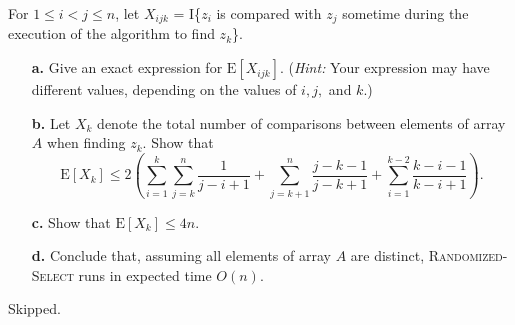 \begin{enumerate}
{For $1 \le i < j \le n$, let $X_{ijk}$ = I\{$z_i$ is compared with $z_j$
sometime during the execution of the algorithm to find $z_k$\}.

\begin{enumerate}
\item[\textbf{a.}] Give an exact expression for $\text{E}[X_{ijk}]$.
(\emph{Hint:} Your expression may have different values, depending on the values
of $i, j,$ and $k$.)

\item[\textbf{b.}] Let $X_k$ denote the total number of comparisons between
elements of array $A$ when finding $z_k$. Show that
\[
  \text{E}[X_k] \le 2 \left( \sum_{i = 1}^{k} \sum_{j = k}^{n} \frac{1}{j - i + 1} +
                             \sum_{j = k + 1}^{n} \frac{j - k - 1}{j - k + 1} +
                             \sum_{i = 1}^{k - 2} \frac{k - i - 1}{k - i + 1} \right).
\]

\item[\textbf{c.}] Show that $\text{E}[X_k] \le 4n$.

\item[\textbf{d.}] Conclude that, assuming all elements of array $A$ are
distinct, \textsc{Randomized-Select} runs in expected time $O(n)$.
\end{enumerate}
}

\begin{framed}
Skipped.
\end{framed}

\end{enumerate}
